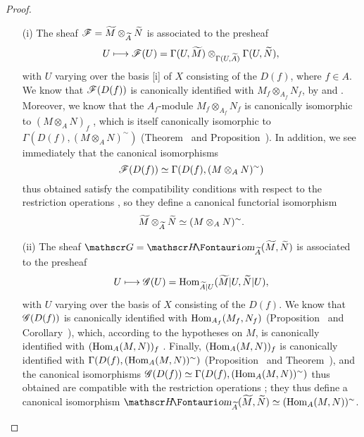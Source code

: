 \begin{proof}
\label{proof-I.1.3.12}
\medskip\noindent
\begin{enumerate}
  \item[(i)] The sheaf $\mathscr{F}=\widetilde{M}\otimes_{\widetilde{A}}\widetilde{N}$ is associated to the presheaf
    \[
      U\mapsto\sh{F}(U)=\Gamma(U,\widetilde{M})\otimes_{\Gamma(U,\widetilde{A})}\Gamma(U,\widetilde{N}),
    \]
    with $U$ varying over the basis [i] of $X$ consisting of the $D(f)$, where $f\in A$.
    We know that $\mathscr{F}(D(f))$ is canonically identified with $M_f\otimes_{A_f}N_f$, by  and .
    Moreover, we know that the $A_f$-module $M_f\otimes_{A_f}N_f$ is canonically
    isomorphic to $(M\otimes_A N)_f$ , which is itself canonically isomorphic to $\Gamma(D(f),(M\otimes_A N)^\sim)$ (Theorem~ and Proposition~).
    In addition, we see immediately that the canonical isomorphisms
    \[
      \mathscr{F}(D(f))\simeq\Gamma(D(f),(M\otimes_A N)^\sim)
    \]
    thus obtained satisfy the compatibility conditions with respect to the restriction operations , so they define a canonical functorial isomorphism
    \[
      \widetilde{M}\otimes_{\widetilde{A}}\widetilde{N}\simeq(M\otimes_A N)^\sim.
    \]
  \item[(ii)] The sheaf $\sh{G}=\shHom_{\widetilde{A}}(\widetilde{M},\widetilde{N})$ is associated to the presheaf
    \[
      U\mapsto\sh{G}(U)=\Hom_{\widetilde{A}|U}(\widetilde{M}|U,\widetilde{N}|U),
    \]
    with $U$ varying over the basis of $X$ consisting of the $D(f)$.
    We know that $\mathscr{G}(D(f))$ is canonically identified with $\operatorname{Hom}_{A_f}(M_f,N_f)$ (Proposition~ and
    Corollary~), which, according to the hypotheses on $M$, is canonically identified with $(\operatorname{Hom}_A(M,N))_f$ .
    Finally, $(\operatorname{Hom}_A(M,N))_f$ is canonically identified with $\Gamma(D(f),(\operatorname{Hom}_A(M,N))^\sim)$ (Proposition~ and Theorem~), and the canonical isomorphisms $\mathscr{G}(D(f))\simeq\Gamma(D(f),(\operatorname{Hom}_A(M,N))^\sim)$ thus obtained are compatible with the restriction operations ;
    they thus define a canonical isomorphism $\shHom_{\widetilde{A}}(\widetilde{M},\widetilde{N})\isoto(\Hom_A(M,N))^\sim$.
\end{enumerate}
\end{proof}

